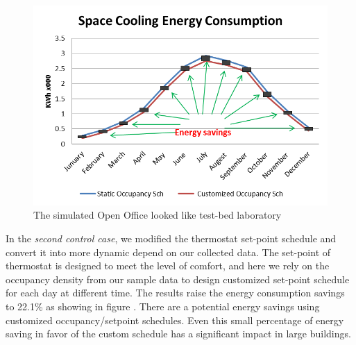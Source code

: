 \begin{figure}[!ht]
  \centering
 	  	\includegraphics[width=0.9\columnwidth]{./images/energysavings.png}
  \caption{The simulated Open Office looked like test-bed laboratory}\label{fig:engsav}
\end{figure}

In the {\em second control case}, we modified the thermostat set-point schedule and convert it into more dynamic depend on our collected data. The set-point of thermostat is designed to meet the level of comfort, and here we rely on the occupancy density from our sample data to design customized set-point schedule for each day at different time. The results raise the energy consumption savings to 22.1\% as showing in figure  . There are a potential energy savings using customized occupancy/setpoint schedules. Even this small percentage of energy saving in favor of the custom schedule has a significant impact in large buildings. 